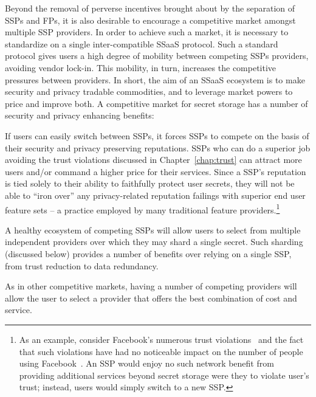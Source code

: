Beyond the removal of perverse incentives brought about by the
separation of SSPs and FPs, it is also desirable to encourage a
competitive market amongst multiple SSP providers. In order to achieve
such a market, it is necessary to standardize on a single
inter-compatible SSaaS protocol. Such a standard protocol gives users
a high degree of mobility between competing SSPs providers, avoiding
vendor lock-in. This mobility, in turn, increases the competitive
pressures between providers. In short, the aim of an SSaaS ecosystem
is to make security and privacy tradable commodities, and to leverage
market powers to price and improve both. A competitive market for
secret storage has a number of security and privacy enhancing
benefits:

\begin{packed_desc}
\item[Reputation:] If users can easily switch between SSPs, it forces
  SSPs to compete on the basis of their security and privacy
  preserving reputations. SSPs who can do a superior job avoiding the
  trust violations discussed in Chapter~\ref{chap:trust} can attract
  more users and/or command a higher price for their services. Since a
  SSP's reputation is tied solely to their ability to faithfully
  protect user secrets, they will not be able to ``iron over'' any
  privacy-related reputation failings with superior end user feature
  sets -- a practice employed by many traditional feature
  providers.\footnote{As an example, consider Facebook's numerous
    trust violations~\cite{goel2014, lomas2014, tsukayama2014} and the
    fact that such violations have had no noticeable impact on the
    number of people using Facebook~\cite{foster2014}. An SSP would
    enjoy no such network benefit from providing additional services
    beyond secret storage were they to violate user's trust; instead,
    users would simply switch to a new SSP.}
\item[Multiple Providers:] A healthy ecosystem of competing SSPs will
  allow users to select from multiple independent providers over which
  they may shard a single secret. Such sharding (discussed below)
  provides a number of benefits over relying on a single SSP, from
  trust reduction to data redundancy.
\item[Cost:] As in other competitive markets, having a number of
  competing providers will allow the user to select a provider that
  offers the best combination of cost and service.
\end{packed_desc}

